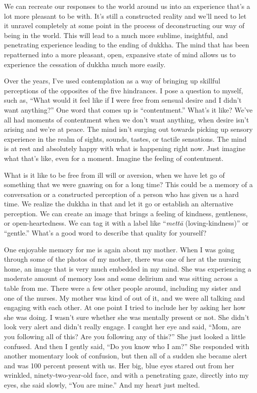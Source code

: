 We can recreate our responses to the world around us into an experience that's a lot more pleasant to be with. It's still a constructed reality and we'll need to let it unravel completely at some point in the process of deconstructing our way of being in the world. This will lead to a much more sublime, insightful, and penetrating experience leading to the ending of dukkha. The mind that has been repatterned into a more pleasant, open, expansive state of mind allows us to experience the cessation of dukkha much more easily.

Over the years, I've used contemplation as a way of bringing up skillful perceptions of the opposites of the five hindrances. I pose a question to myself, such as, ``What would it feel like if I were free from sensual desire and I didn't want anything?'' One word that comes up is ``contentment.'' What's it like? We've all had moments of contentment when we don't want anything, when desire isn't arising and we're at peace. The mind isn't surging out towards picking up sensory experience in the realm of sights, sounds, tastes, or tactile sensations. The mind is at rest and absolutely happy with what is happening right now. Just imagine what that's like, even for a moment. Imagine the feeling of contentment.

What is it like to be free from ill will or aversion, when we have let go of something that we were gnawing on for a long time? This could be a memory of a conversation or a constructed perception of a person who has given us a hard time. We realize the dukkha in that and let it go or establish an alternative perception. We can create an image that brings a feeling of kindness, gentleness, or open-heartedness. We can tag it with a label like ``\emph{mettā} (loving-kindness)'' or ``gentle.'' What's a good word to describe that quality for yourself?

One enjoyable memory for me is again about my mother. When I was going through some of the photos of my mother, there was one of her at the nursing home, an image that is very much embedded in my mind. She was experiencing a moderate amount of memory loss and some delirium and was sitting across a table from me. There were a few other people around, including my sister and one of the nurses. My mother was kind of out of it, and we were all talking and engaging with each other. At one point I tried to include her by asking her how she was doing. I wasn't sure whether she was mentally present or not. She didn't look very alert and didn't really engage. I caught her eye and said, ``Mom, are you following all of this? Are you following any of this?'' She just looked a little confused. And then I gently said, ``Do you know who I am?'' She responded with another momentary look of confusion, but then all of a sudden she became alert and was 100 percent present with us. Her big, blue eyes stared out from her wrinkled, ninety-two-year-old face, and with a penetrating gaze, directly into my eyes, she said slowly, ``You are mine.'' And my heart just melted.

